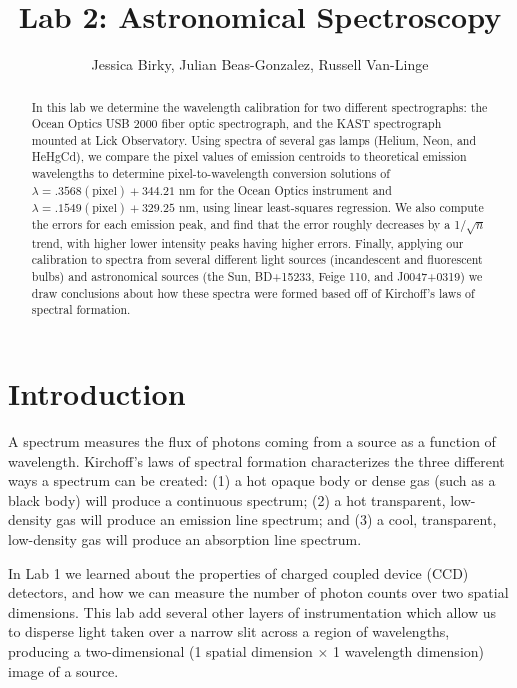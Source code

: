 \documentclass[preprint]{aastex62}
\begin{document}
\title{\sc Lab 2: Astronomical Spectroscopy}
\author{Jessica Birky, Julian Beas-Gonzalez, Russell Van-Linge}


\begin{abstract}
In this lab we determine the wavelength calibration for two different spectrographs: the Ocean Optics USB 2000 fiber optic spectrograph, and the KAST spectrograph mounted at Lick Observatory. Using spectra of several gas lamps (Helium, Neon, and HeHgCd), we compare the pixel values of emission centroids to theoretical emission wavelengths to determine pixel-to-wavelength conversion solutions of $\lambda=.3568(\mathrm{pixel})+344.21$ nm for the Ocean Optics instrument and  $\lambda=.1549(\mathrm{pixel})+329.25$ nm, using linear least-squares regression. We also compute the errors for each emission peak, and find that the error roughly decreases by a 1/$\sqrt{n}$ trend, with higher lower intensity peaks having higher errors. Finally, applying our calibration to spectra from several different light sources (incandescent and fluorescent bulbs) and astronomical sources (the Sun, BD+15233, Feige 110, and J0047+0319) we draw conclusions about how these spectra were formed based off of Kirchoff's laws of spectral formation.

\end{abstract}
\bigskip

\section{Introduction} 
A spectrum measures the flux of photons coming from a source as a function of wavelength. Kirchoff's laws of spectral formation characterizes the three different ways a spectrum can be created: (1) a hot opaque body or dense gas (such as a black body) will produce a continuous spectrum; (2) a hot transparent, low-density gas will produce an emission line spectrum; and (3) a cool, transparent, low-density gas will produce an absorption line spectrum.

In Lab 1 we learned about the properties of charged coupled device (CCD) detectors, and how we can measure the number of photon counts over two spatial dimensions. This lab add several other layers of instrumentation which allow us to disperse light taken over a narrow slit across a region of wavelengths, producing a two-dimensional (1 spatial dimension $\times$ 1 wavelength dimension) image of a source. \color{red}{gratings/grisms, collimator, detector setup...}\color{black}
\end{document}
